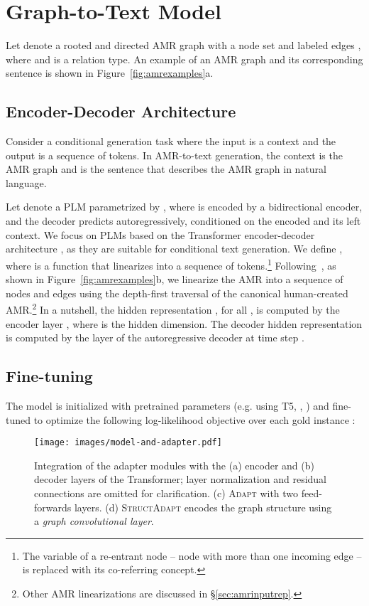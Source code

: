 \documentclass[11pt]{article}
\newcommand{\graphadapter}{{\small\textsc{StructAdapt}}\xspace}
\newcommand{\vanilladapter}{{\small\textsc{Adapt}}\xspace}
\begin{document}
\section{Graph-to-Text Model}

Let  denote a rooted and directed AMR graph with a node set  and labeled edges , where  and  is a relation type. An example of an AMR graph and its corresponding sentence is shown in Figure~\ref{fig:amrexamples}a.

\subsection{Encoder-Decoder Architecture}
\label{sec:baselinemodel}
Consider a conditional generation task where the input is a context  and the output  is a sequence of tokens. In AMR-to-text generation, the context  is the AMR graph and  is the sentence that describes the AMR graph in natural language. 

Let  denote a PLM parametrized by , where  is encoded by a bidirectional encoder, and the decoder predicts  autoregressively, conditioned on the encoded  and its left context. We focus on PLMs based on the Transformer encoder-decoder architecture \cite{NIPS2017_7181}, as they are suitable for conditional text generation. We define , where  is a function that linearizes  into a sequence of tokens.\footnote{The variable of a re-entrant node -- node with more than one incoming edge -- is replaced with its co-referring concept.} Following~\citet{damonte-cohen-2019-structural}, as shown in Figure~\ref{fig:amrexamples}b, we linearize the AMR into a sequence of nodes and edges using the depth-first traversal of the canonical human-created AMR.\footnote{Other AMR linearizations are discussed in \S\ref{sec:amrinputrep}.} In a nutshell, the hidden representation , for all , is computed by the encoder layer , where  is the hidden dimension. The decoder hidden representation  is computed by the layer  of the autoregressive decoder at time step .


\subsection{Fine-tuning}
The model is initialized with pretrained parameters  (e.g. using T5, \citeauthor{2019t5}, \citeyear{2019t5}) and fine-tuned to optimize the following log-likelihood objective over each gold instance :


\begin{figure}[t]
    \centering
    \texttt{[image: images/model-and-adapter.pdf]}
    \caption{Integration of the adapter modules with the (a) encoder and (b) decoder layers of the Transformer; layer normalization and residual connections are omitted for clarification. (c) \vanilladapter with two feed-forwards layers. (d) \graphadapter encodes the graph structure using a \emph{graph convolutional layer}.}
    \label{fig:adapterarc}
\end{figure}
\end{document}
